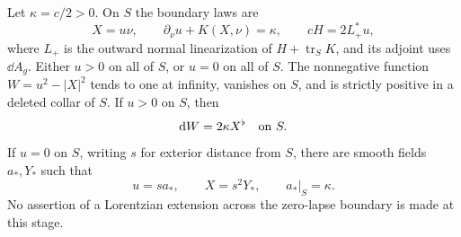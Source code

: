 \begin{proposition}
Let $\kappa=c/2>0$.  On $S$ the boundary laws are
\begin{equation}
 X=u\nu,\qquad
 \partial_\nu u+K(X,\nu)=\kappa,\qquad
 cH=2L_+^*u,
 \label{var:horizon-boundary-laws}
\end{equation}
where $L_+$ is the outward normal linearization of
$H+\operatorname{tr}_S K$, and its adjoint uses $\dd A_g$.
Either $u>0$ on all of $S$, or $u=0$ on all of $S$.
The nonnegative function $W=u^2-|X|^2$ tends to one at
infinity, vanishes on $S$, and is strictly positive in a
deleted collar of $S$.  If $u>0$ on $S$, then
\begin{equation}
 \mathrm d W=2\kappa X^\flat\quad\hbox{on }S.
 \label{var:positive-lapse-boundary}
\end{equation}
If $u=0$ on $S$, writing $s$ for exterior distance from $S$,
there are smooth fields $a_*,Y_*$ such that
\begin{equation}
 u=s a_*,\qquad X=s^2Y_*,\qquad a_*|_S=\kappa.
 \label{var:zero-lapse-boundary}
\end{equation}
No assertion of a Lorentzian extension across the zero-lapse
boundary is made at this stage.
\end{proposition}

